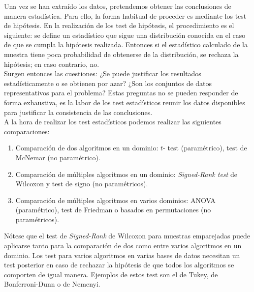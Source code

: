 	Una vez se han extraído los datos, pretendemos obtener
las conclusiones de manera estadística. Para ello, la 
forma habitual de proceder es mediante los test de hipótesis.
En la realización de los test de hipótesis, el 
procedimiento es el siguiente: se define un estadístico que 
sigue una distribución conocida en el caso de que se cumpla 
la hipótesis realizada. Entonces si el estadístico calculado 
de la muestra tiene poca probabilidad de obtenerse de la 
distribución, se rechaza la hipótesis; en caso contrario, no. 
\\
	Surgen entonces las cuestiones: ¿Se puede justificar los 
resultados estadísticamente o se obtienen por azar? ¿Son los 
conjuntos de datos representativos para el problema? Estas 
preguntas no se pueden responder de forma exhaustiva, es la 
labor de los test estadísticos reunir los datos disponibles 
para justificar la consistencia de las conclusiones. \\
	A la hora de realizar los test estadísticos podemos 
realizar las siguientes comparaciones:
	\begin{enumerate}
	\item Comparación de dos algoritmos en un dominio: $t$-
		test (paramétrico), test de McNemar (no paramétrico).
	\item Comparación de múltiples algoritmos en un dominio: 
		\textit{Signed-Rank test} de Wilcoxon y test de signo 
		(no paramétricos).
	\item Comparación de múltiples algoritmos en varios 
		dominios: ANOVA (paramétrico), test de Friedman o 
		basados en permutaciones (no paramétricos). 
	\end{enumerate}

	Nótese que el test de \textit{Signed-Rank} de Wilcoxon 
para muestras emparejadas puede aplicarse tanto para la 
comparación de dos como entre varios algoritmos en un 
dominio. Los test para varios algoritmos en varias bases de 
datos necesitan un test posterior en caso de rechazar la 
hipótesis de que todos los algoritmos se comporten de igual 
manera. Ejemplos de estos test son el de Tukey, de 
Bonferroni-Dunn o de Nemenyi. 

